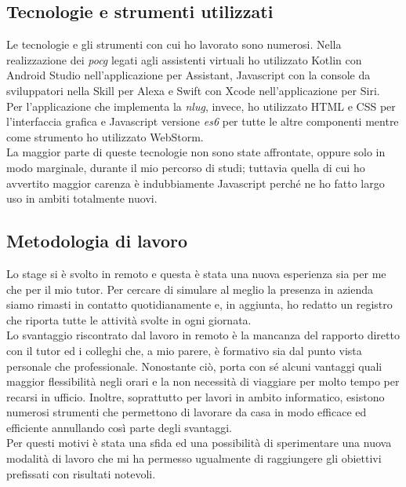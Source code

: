\subsection{Tecnologie e strumenti utilizzati}
Le tecnologie e gli strumenti con cui ho lavorato sono numerosi. Nella realizzazione dei \emph{\gls{pocg}} legati agli assistenti virtuali ho utilizzato Kotlin con Android Studio nell'applicazione per Assistant, Javascript con la console da sviluppatori nella Skill per Alexa e Swift con Xcode nell'applicazione per Siri. \\
Per l'applicazione che implementa la \emph{\gls{nlug}}, invece, ho utilizzato HTML e CSS per l'interfaccia grafica e Javascript versione \emph{\gls{es6}} per tutte le altre componenti mentre come strumento ho utilizzato WebStorm. \\
La maggior parte di queste tecnologie non sono state affrontate, oppure solo in modo marginale, durante il mio percorso di studi; tuttavia quella di cui ho avvertito maggior carenza è indubbiamente Javascript perché ne ho fatto largo uso in ambiti totalmente nuovi.
\subsection{Metodologia di lavoro}
Lo stage si è svolto in remoto e questa è stata una nuova esperienza sia per me che per il mio tutor. Per cercare di simulare al meglio la presenza in azienda siamo rimasti in contatto quotidianamente e, in aggiunta, ho redatto un registro che riporta tutte le attività svolte in ogni giornata. \\
Lo svantaggio riscontrato dal lavoro in remoto è la mancanza del rapporto diretto con il tutor ed i colleghi che, a mio parere, è formativo sia dal punto vista personale che professionale. Nonostante ciò, porta con sé alcuni vantaggi quali maggior flessibilità negli orari e la non necessità di viaggiare per molto tempo per recarsi in ufficio. Inoltre, soprattutto per lavori in ambito informatico, esistono numerosi strumenti che permettono di lavorare da casa in modo efficace ed efficiente annullando così parte degli svantaggi. \\
Per questi motivi è stata una sfida ed una possibilità di sperimentare una nuova modalità di lavoro che mi ha permesso ugualmente di raggiungere gli obiettivi prefissati con risultati notevoli.
